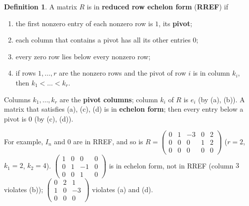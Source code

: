 \documentclass[12pt]{article}
\theoremstyle{definition}
\newtheorem{definition}[theorem]{Definition}
\begin{document}
\begin{definition}\label{b2.4}
A matrix \(R\) is in \textbf{reduced row echelon form} (\textbf{RREF}) if
\begin{enumerate}
\item the first nonzero entry of each nonzero row is \(1\), its \textbf{pivot};
\item each column that contains a pivot has all its other entries \(0\);
\item every zero row lies below every nonzero row;
\item if rows \(1,\dots,r\) are the nonzero rows and the pivot of row \(i\) is in column \(k_i\), then
\(k_1<\dots<k_r\).
\end{enumerate}
Columns \(k_1,\dots,k_r\) are the \textbf{pivot columns}; column \(k_i\) of \(R\) is \(e_i\) (by (a), (b)). A matrix
that satisfies (a), (c), (d) is in \textbf{echelon form}; then every entry below a pivot is \(0\) (by (c), (d)).
\end{definition}
For example, \(I_n\) and \(0\) are in RREF, and so is
\(R=\left(\begin{smallmatrix}0&1&-3&0&2\\0&0&0&1&2\\0&0&0&0&0\end{smallmatrix}\right)\) (\(r=2\), \(k_1=2\),
\(k_2=4\)). \(\left(\begin{smallmatrix}1&0&0&0\\0&1&-1&0\\0&0&1&0\end{smallmatrix}\right)\) is in echelon form, not in
RREF (column \(3\) violates (b)); \(\left(\begin{smallmatrix}0&2&1\\1&0&-3\\0&0&0\end{smallmatrix}\right)\) violates (a)
and (d).
\end{document}

